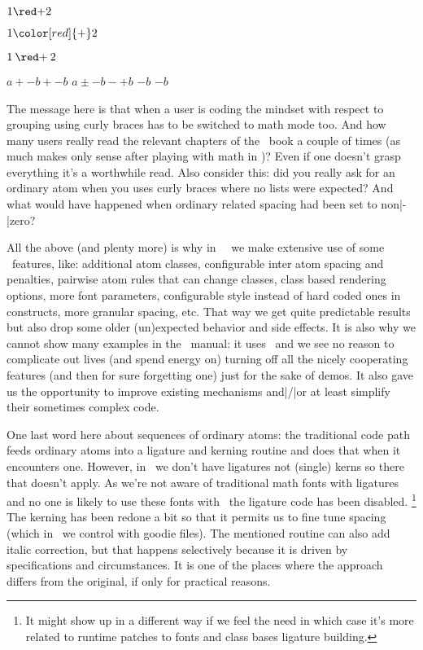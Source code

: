 \starttyping
$ 1 {\red +} 2$\par
$ 1 \color[red]{+} 2$\par
$ 1 \mathbin{\red +} 2$\par
$ a + - b + {- b} $
$ a \pm - b - {+ b} $
$ - b $
$ {- b} $
\stoptyping

The message here is that when a user is coding the mindset with respect to
grouping using curly braces has to be switched to math mode too. And how many
users really read the relevant chapters of the \TEX\ book a couple of times (as
much makes only sense after playing with math in \TEX)? Even if one doesn't grasp
everything it's a worthwhile read. Also consider this: did you really ask for an
ordinary atom when you uses curly braces where no lists were expected? And what
would have happened when ordinary related spacing had been set to non|-|zero?

All the above (and plenty more) is why in \CONTEXT\ \LMTX\ we make extensive use
of some \LUAMETATEX\ features, like: additional atom classes, configurable inter
atom spacing and penalties, pairwise atom rules that can change classes, class
based rendering options, more font parameters, configurable style instead of hard
coded ones in constructs, more granular spacing, etc. That way we get quite
predictable results but also drop some older (un)expected behavior and side
effects. It is also why we cannot show many examples in the \LUAMETATEX\ manual:
it uses \CONTEXT\ and we see no reason to complicate out lives (and spend energy
on) turning off all the nicely cooperating features (and then for sure forgetting
one) just for the sake of demos. It also gave us the opportunity to improve
existing mechanisms and|/|or at least simplify their sometimes complex code.

One last word here about sequences of ordinary atoms: the traditional code path
feeds ordinary atoms into a ligature and kerning routine and does that when it
encounters one. However, in \OPENTYPE\ we don't have ligatures not (single) kerns
so there that doesn't apply. As we're not aware of traditional math fonts with
ligatures and no one is likely to use these fonts with \LUAMETATEX\ the ligature
code has been disabled. \footnote {It might show up in a different way if we feel
the need in which case it's more related to runtime patches to fonts and class
bases ligature building.} The kerning has been redone a bit so that it permits us
to fine tune spacing (which in \CONTEXT\ we control with goodie files). The
mentioned routine can also add italic correction, but that happens selectively
because it is driven by specifications and circumstances. It is one of the places
where the approach differs from the original, if only for practical reasons.


